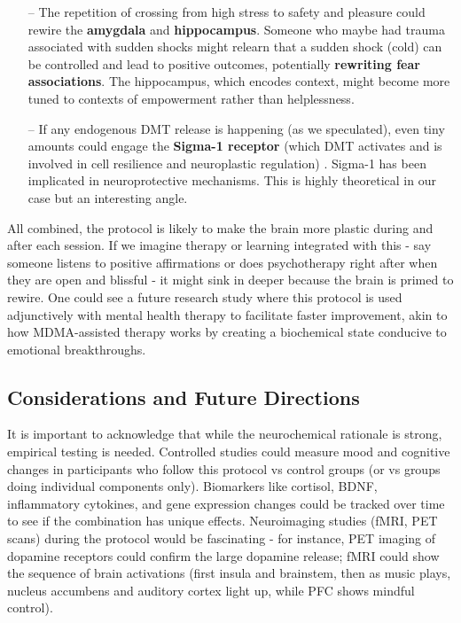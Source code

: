 \documentclass[11pt]{article}
\begin{document}
\begin{itemize}
\item[--] The repetition of crossing from high stress to safety and pleasure could rewire the \textbf{amygdala} and \textbf{hippocampus}. Someone who maybe had trauma associated with sudden shocks might relearn that a sudden shock (cold) can be controlled and lead to positive outcomes, potentially \textbf{rewriting fear associations}. The hippocampus, which encodes context, might become more tuned to contexts of empowerment rather than helplessness.
\item[--] If any endogenous DMT release is happening (as we speculated), even tiny amounts could engage the \textbf{Sigma-1 receptor} (which DMT activates and is involved in cell resilience and neuroplastic regulation) \cite{javierJimenez}. Sigma-1 has been implicated in neuroprotective mechanisms. This is highly theoretical in our case but an interesting angle.
\end{itemize}

All combined, the protocol is likely to make the brain more plastic during and after each session. If we imagine therapy or learning integrated with this - say someone listens to positive affirmations or does psychotherapy right after when they are open and blissful - it might sink in deeper because the brain is primed to rewire. One could see a future research study where this protocol is used adjunctively with mental health therapy to facilitate faster improvement, akin to how MDMA-assisted therapy works by creating a biochemical state conducive to emotional breakthroughs.

\subsection{Considerations and Future Directions}

It is important to acknowledge that while the neurochemical rationale is strong, empirical testing is needed. Controlled studies could measure mood and cognitive changes in participants who follow this protocol vs control groups (or vs groups doing individual components only). Biomarkers like cortisol, BDNF, inflammatory cytokines, and gene expression changes could be tracked over time to see if the combination has unique effects. Neuroimaging studies (fMRI, PET scans) during the protocol would be fascinating - for instance, PET imaging of dopamine receptors could confirm the large dopamine release; fMRI could show the sequence of brain activations (first insula and brainstem, then as music plays, nucleus accumbens and auditory cortex light up, while PFC shows mindful control).
\end{document}
